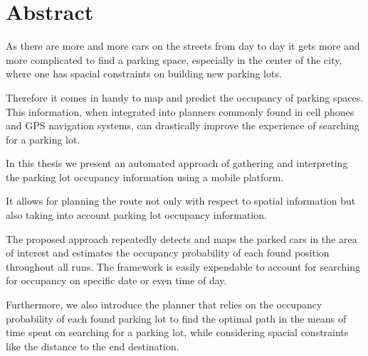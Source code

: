 \chapter*{Abstract}
\label{cha:abstract}

As there are more and more cars on the streets from day to day it gets more and
more complicated to find a parking space, especially in the center of the city,
where one has spacial constraints on building new parking lots.

Therefore it comes in handy to map and predict the occupancy of parking spaces.
This information, when integrated into planners commonly found in cell phones
and GPS navigation systems, can drastically improve the experience of searching
for a parking lot.

In this thesis we present an automated approach of gathering and interpreting
the parking lot occupancy information using a mobile platform.

It allows for planning the route not only
with respect to spatial information but also taking into account parking lot
occupancy information.

The proposed approach repeatedly detects and maps the parked cars in the area of interest
and estimates the occupancy probability of each found position throughout all runs. The framework
is easily expendable to account for searching for occupancy on specific date or
even time of day.

Furthermore, we also introduce the planner that relies on the occupancy
probability of each found parking lot to find the optimal path in the means of time spent on
searching for a parking lot, while considering spacial constraints like the
distance to the end destination.



